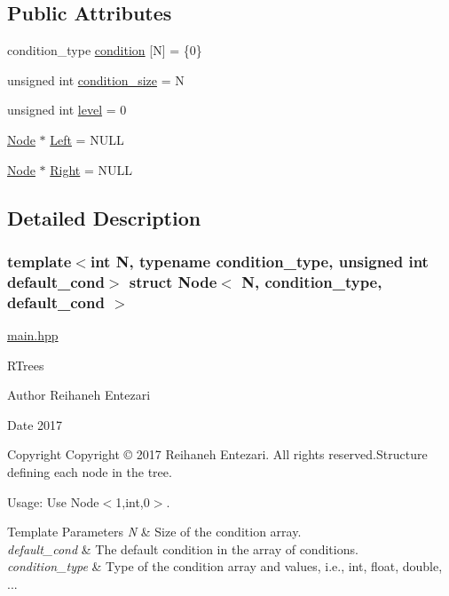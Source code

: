 \subsection*{Public Attributes}
\begin{DoxyCompactItemize}
\item 
condition\+\_\+type \hyperlink{struct_node_a84fa4c586396e81041eb3a4f6a46f418}{condition} \mbox{[}N\mbox{]} = \{0\}
\item 
unsigned int \hyperlink{struct_node_a89d21337f6535c79bb46bbf132e57313}{condition\+\_\+size} = N
\item 
unsigned int \hyperlink{struct_node_a64a379c6dd2c75ade9687670c517b7e7}{level} = 0
\item 
\hyperlink{struct_node}{Node} $\ast$ \hyperlink{struct_node_a779292dace788d33114830cca763ccf3}{Left} = N\+U\+LL
\item 
\hyperlink{struct_node}{Node} $\ast$ \hyperlink{struct_node_ae5ad7032e0a9a52f5a849e33e23a7dfa}{Right} = N\+U\+LL
\end{DoxyCompactItemize}


\subsection{Detailed Description}
\subsubsection*{template$<$int N, typename condition\+\_\+type, unsigned int default\+\_\+cond$>$\newline
struct Node$<$ N, condition\+\_\+type, default\+\_\+cond $>$}

\hyperlink{main_8hpp}{main.\+hpp} 

R\+Trees \begin{DoxyAuthor}{Author}
Reihaneh Entezari 
\end{DoxyAuthor}
\begin{DoxyDate}{Date}
2017 
\end{DoxyDate}
\begin{DoxyCopyright}{Copyright}
Copyright © 2017 Reihaneh Entezari. All rights reserved.\+Structure defining each node in the tree.
\end{DoxyCopyright}
Usage\+: Use {\ttfamily Node$<$1,int,0$>$}. 
\begin{DoxyTemplParams}{Template Parameters}
{\em N} & Size of the {\ttfamily condition} array. \\
\hline
{\em default\+\_\+cond} & The default condition in the array of conditions. \\
\hline
{\em condition\+\_\+type} & Type of the condition array and values, i.\+e., int, float, double, ... \\
\hline
\end{DoxyTemplParams}


